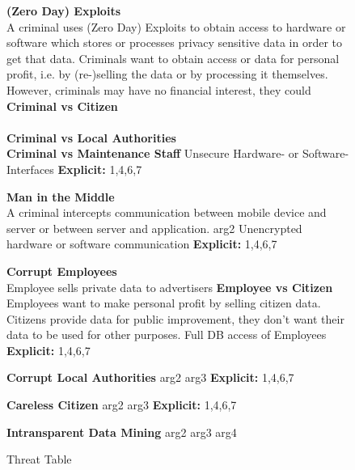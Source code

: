 \begin{landscape}
\begin{figure}
\centering
\begin{ThreatTable}

\ThreatTableContentRow
{\textbf{(Zero Day) Exploits}
\\A criminal uses (Zero Day) Exploits to obtain access to hardware or software which stores or processes
privacy sensitive data in order to get that data.}
{Criminals want to obtain access or data for personal profit, i.e. by (re-)selling the data or  by processing it themselves. 
However, criminals may have no financial interest, they could 
\\\textbf{Criminal vs Citizen}
\\
\\ \textbf{Criminal vs Local Authorities}
\\ \textbf{Criminal vs Maintenance Staff}}
{Unsecure Hardware- or Software-Interfaces}
{\textbf{Explicit:} 1,4,6,7}

\ThreatTableContentRow
{\textbf{Man in the Middle} 
\\A criminal intercepts communication between mobile device and server or between server and application.}
{arg2}
{Unencrypted hardware or software communication}
{\textbf{Explicit:} 1,4,6,7}

\ThreatTableContentRow
{\textbf{Corrupt Employees} 
\\ Employee sells private data to advertisers}
{\textbf{Employee vs Citizen} 
\\ Employees want to make personal profit by selling citizen data. 
\\ Citizens provide data for public improvement, they don't want their data to be used for other purposes.}
{Full DB access of Employees}
{\textbf{Explicit:} 1,4,6,7}

\ThreatTableContentRow
{\textbf{Corrupt Local Authorities}}
{arg2}
{arg3}
{\textbf{Explicit:} 1,4,6,7}

\ThreatTableContentRow
{\textbf{Careless Citizen}}
{arg2}
{arg3}
{\textbf{Explicit:} 1,4,6,7}

\ThreatTableContentRow
{\textbf{Intransparent Data Mining}}
{arg2}
{arg3}
{arg4}

\end{ThreatTable}

\caption{Threat Table}
\end{figure}
\end{landscape}
